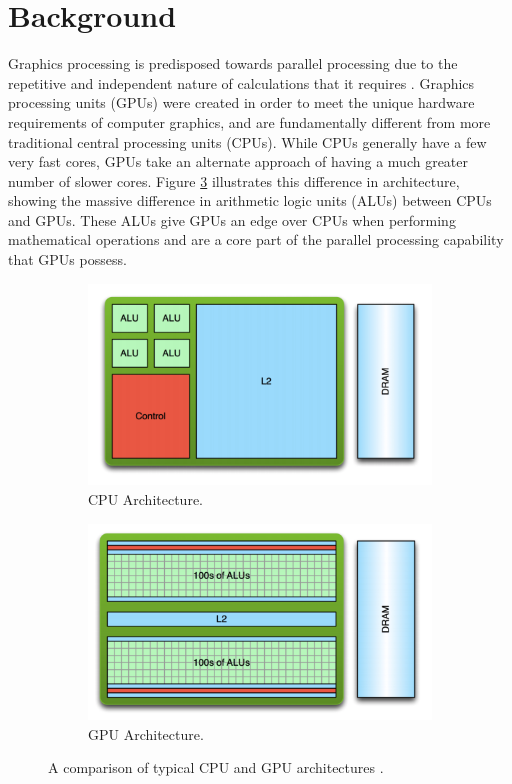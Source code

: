 \documentclass{article}
\begin{document}
\section{Background}
Graphics processing is predisposed towards parallel processing due to the repetitive and independent nature of calculations that it requires \cite[p.~4]{sellers2016}. Graphics processing units (GPUs) were created in order to meet the unique hardware requirements of computer graphics, and are fundamentally different from more traditional central processing units (CPUs). While CPUs generally have a few very fast cores, GPUs take an alternate approach of having a much greater number of slower cores. Figure \ref{fig:architecture} illustrates this difference in architecture, showing the massive difference in arithmetic logic units (ALUs) between CPUs and GPUs. These ALUs give GPUs an edge over CPUs when performing mathematical operations and are a core part of the parallel processing capability that GPUs possess.

\begin{figure}[h]
    \centering
    \begin{subfigure}[h]{0.39\textwidth}
    	\includegraphics[width=\textwidth]{cpu}
    	\caption{CPU Architecture.}
    	\label{fig:cpu}
    \end{subfigure}
    \begin{subfigure}[h]{0.39\textwidth}
	    \includegraphics[width=\textwidth]{gpu}
	    \caption{GPU Architecture.}
	    \label{fig:gpu}
    \end{subfigure}
	\caption{A comparison of typical CPU and GPU architectures \cite{larkin2016}.}
	\label{fig:architecture}
\end{figure}
\end{document}
